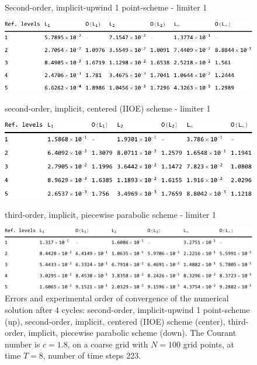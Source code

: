 \documentclass[../thesis.tex]{subfiles}
\begin{document}
\begin{figure}[H]
	\centering
    \caption*{Second-order, implicit-upwind 1 point-scheme - limiter 1}
	\includegraphics[width=\textwidth]{../tab/tab-1point-c1p8-T8-limit1-smooth.pdf}
    \caption*{second-order, implicit, centered (IIOE) scheme - limiter 1}
	\includegraphics[width=\textwidth]{../tab/tab-iioe-c1p8-T8-limit1-smooth.pdf}
    \caption*{third-order, implicit, piecewise parabolic scheme - limiter 1}
	\includegraphics[width=\textwidth]{../tab/tab-implicit-ppm-c1p8-T8-limit1-smooth.pdf}
	\caption{Errors and experimental order of convergence of the numerical solution after 4 cycles: second-order, implicit-upwind 1 point-scheme (up), second-order, implicit, centered (IIOE) scheme (center), third-order, implicit, piecewise parabolic scheme (down). The Courant number is \(c = 1.8\), on a coarse grid with \(N = 100\) grid points, at time \(T = 8\), number of time steps 223.}
	\label{tab:c1p8-T8-limit1-smooth}
\end{figure}
\end{document}
